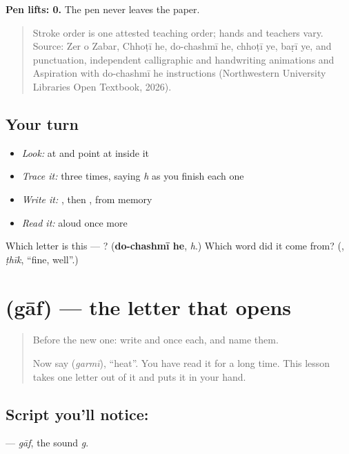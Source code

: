 \textbf{Pen lifts: 0.} The pen never leaves the paper.

\begin{quote}
Stroke order is one attested teaching order; hands and teachers vary. Source: Zer o Zabar, Chhoṭī he, do-chashmī he, chhoṭī ye, baṛī ye, and punctuation, independent  calligraphic and handwriting animations and Aspiration with do-chashmī he instructions (Northwestern University Libraries Open Textbook, 2026).
\end{quote}

\subsection*{Your turn}
\begin{itemize}
\raggedright
  \item \emph{Look:} at \textbf{} and point at  inside it
  \item \emph{Trace it:}  three times, saying \emph{h} as you finish each one
  \item \emph{Write it:} , then , from memory
  \item \emph{Read it:} \textbf{} aloud once more
\end{itemize}

\begin{tcolorbox}[breakable,colback=teal!4,colframe=teal!35!black,title={Before you move on}]
Which letter is this — ? (\textbf{do-chashmī he}, \emph{h}.) Which word did it come from? (\textbf{}, \emph{ṭhīk}, \textquotedblleft{}fine, well\textquotedblright{}.)
\end{tcolorbox}
\section[\texorpdfstring{\ur{گ} (gāf)}{گ (gāf)}]{ (gāf) — the letter that opens }

\label{lesson:UR-W36-gaf}



\begin{quote}
Before the new one: write  and  once each, and name them.

Now say \textbf{} (\emph{garmī}), \textquotedblleft{}heat\textquotedblright{}. You have read it for a long time. This lesson takes one letter out of it and puts it in your hand.
\end{quote}

\subsection*{Script you'll notice: }
\textbf{} — \emph{gāf}, the sound \emph{g}.

